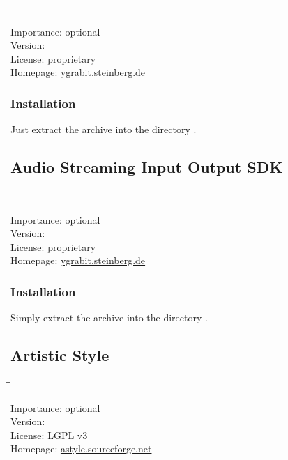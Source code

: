 \begin{tabbing}
  \hspace*{6em}\=\=\kill

  Importance:  \> optional \\
  Version:      \\
  License:     \> proprietary \\
  Homepage:    \> \href{http://ygrabit.steinberg.de/}{ygrabit.steinberg.de}
\end{tabbing}

\subsubsection{Installation}

Just extract the archive into the directory
.

\subsection{Audio Streaming Input Output SDK}

\begin{tabbing}
  \hspace*{6em}\=\=\kill

  Importance:  \> optional \\
  Version:      \\
  License:     \> proprietary \\
  Homepage:    \> \href{http://ygrabit.steinberg.de/}{ygrabit.steinberg.de}
\end{tabbing}

\subsubsection{Installation}

Simply extract the archive into the directory
.

\subsection{Artistic Style}

\begin{tabbing}
  \hspace*{6em}\=\=\kill

  Importance:  \> optional \\
  Version:      \\
  License:     \> LGPL v3 \\
  Homepage:    \> \href{http://astyle.sourceforge.net/}{astyle.sourceforge.net}
\end{tabbing}


